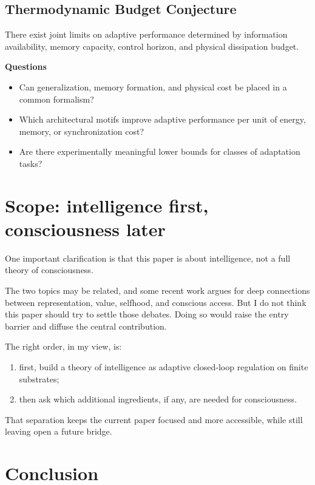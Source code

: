 \documentclass[11pt]{article}
\begin{document}
\subsection{Thermodynamic Budget Conjecture}

There exist joint limits on adaptive performance determined by information availability, memory capacity, control horizon, and physical dissipation budget.

\textbf{Questions}
\begin{itemize}
\item Can generalization, memory formation, and physical cost be placed in a common formalism?
\item Which architectural motifs improve adaptive performance per unit of energy, memory, or synchronization cost?
\item Are there experimentally meaningful lower bounds for classes of adaptation tasks?

\end{itemize}

\section{Scope: intelligence first, consciousness later}


One important clarification is that this paper is about intelligence, not a full theory of consciousness.

The two topics may be related, and some recent work argues for deep connections between representation, value, selfhood, and conscious access. But I do not think this paper should try to settle those debates. Doing so would raise the entry barrier and diffuse the central contribution.

The right order, in my view, is:
\begin{enumerate}
\item first, build a theory of intelligence as adaptive closed-loop regulation on finite substrates;
\item then ask which additional ingredients, if any, are needed for consciousness.

\end{enumerate}

That separation keeps the current paper focused and more accessible, while still leaving open a future bridge.

\section{Conclusion}
\end{document}
